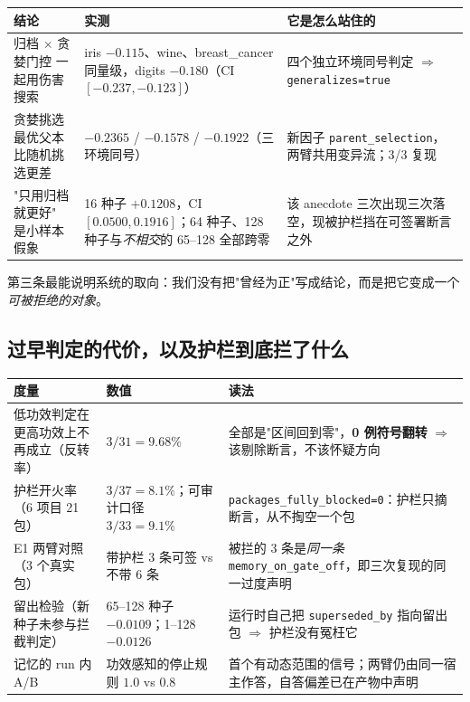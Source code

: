\documentclass[11pt,a4paper]{ctexart}
\begin{document}
\begin{longtable}{p{4.1cm}p{4.0cm}p{6.0cm}}
\toprule
\textbf{结论} & \textbf{实测} & \textbf{它是怎么站住的} \\
\midrule
\endhead
归档 $\times$ 贪婪门控 一起用伤害搜索 & iris $-0.115$、wine、breast\_cancer 同量级，digits $-0.180$（CI $[-0.237,-0.123]$） & 四个独立环境同号判定 $\Rightarrow$ \texttt{generalizes=true} \\
\addlinespace
贪婪挑选最优父本 比随机挑选更差 & $-0.2365$ / $-0.1578$ / $-0.1922$（三环境同号） & 新因子 \texttt{parent\_selection}，两臂共用变异流；3/3 复现 \\
\addlinespace
"只用归档就更好" 是小样本假象 & 16 种子 $+0.1208$，CI $[0.0500,0.1916]$；64 种子、128 种子与\emph{不相交}的 65--128 全部跨零 & 该 anecdote 三次出现三次落空，现被护栏挡在可签署断言之外 \\
\bottomrule
\end{longtable}

第三条最能说明系统的取向：我们没有把"曾经为正"写成结论，而是把它变成一个\emph{可被拒绝的对象}。

\subsection{过早判定的代价，以及护栏到底拦了什么}

\begin{longtable}{p{4.9cm}p{4.0cm}p{6.4cm}}
\toprule
\textbf{度量} & \textbf{数值} & \textbf{读法} \\
\midrule
\endhead
低功效判定在更高功效上不再成立（反转率） & $3/31 = 9.68\%$ & 全部是"区间回到零"，\textbf{0 例符号翻转} $\Rightarrow$ 该剔除断言，不该怀疑方向 \\
\addlinespace
护栏开火率（6 项目 21 包） & $3/37 = 8.1\%$；可审计口径 $3/33 = 9.1\%$ & \texttt{packages\_fully\_blocked=0}：护栏只摘断言，从不掏空一个包 \\
\addlinespace
E1 两臂对照（3 个真实包） & 带护栏 3 条可签 vs 不带 6 条 & 被拦的 3 条是\emph{同一条} \texttt{memory\_on\_gate\_off}，即三次复现的同一过度声明 \\
\addlinespace
留出检验（新种子未参与拦截判定） & 65--128 种子 $-0.0109$；1--128 $-0.0126$ & 运行时自己把 \texttt{superseded\_by} 指向留出包 $\Rightarrow$ 护栏没有冤枉它 \\
\addlinespace
记忆的 run 内 A/B & 功效感知的停止规则 $1.0$ vs $0.8$ & 首个有动态范围的信号；两臂仍由同一宿主作答，自答偏差已在产物中声明 \\
\bottomrule
\end{longtable}
\end{document}
